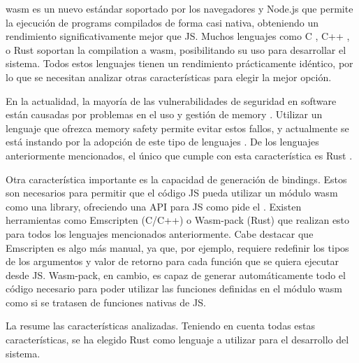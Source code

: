 \gls{wasm} \parencite{wasm} es un nuevo estándar soportado por los navegadores y
Node.js que permite la ejecución de \glspl{program} compilados de forma casi
nativa, obteniendo un rendimiento significativamente mejor que \gls{JS}. Muchos
lenguajes como C \parencite{C}, C++ \parencite{cpp}, o Rust \parencite{Rust}
soportan la \gls{compilation} a \gls{wasm}, posibilitando su uso para desarrollar el
sistema. Todos estos lenguajes tienen un rendimiento prácticamente idéntico, por
lo que se necesitan analizar otras características para elegir la mejor opción.

En la actualidad, la mayoría de las vulnerabilidades de seguridad en software
están causadas por problemas en el uso y gestión de \gls{memory}
\parencite{microsoft-memory-safety} \parencite{mozilla-memory-safety}. Utilizar
un lenguaje que ofrezca \gls{memory safety} permite evitar estos fallos, y
actualmente se está instando por la adopción de este tipo de lenguajes
\parencite{CISA-memory-safety} \parencite{whitehouse-memory-safety}. De los
lenguajes anteriormente mencionados, el único que cumple con esta característica
es Rust \parencite{C-memory-safety}. %

Otra característica importante es la capacidad de generación de \glspl{binding}.
Estos son necesarios para permitir que el código \gls{JS} pueda utilizar un
módulo \gls{wasm} como una \gls{library}, ofreciendo una \gls{API} para \gls{JS}
como pide el . Existen herramientas como Emscripten (C/C++)
\parencite{Emscripten} o Wasm-pack (Rust) \parencite{Wasm-pack} que realizan
esto para todos los lenguajes mencionados anteriormente. Cabe destacar que
Emscripten es algo más manual, ya que, por ejemplo, requiere redefinir los tipos
de los argumentos y valor de retorno para cada función que se quiera ejecutar
desde \gls{JS}. Wasm-pack, en cambio, es capaz de generar automáticamente todo
el código necesario para poder utilizar las funciones definidas en el módulo
\gls{wasm} como si se tratasen de funciones nativas de \gls{JS}.

La  resume las características analizadas. Teniendo
en cuenta todas estas características, se ha elegido Rust como lenguaje a
utilizar para el desarrollo del sistema.

